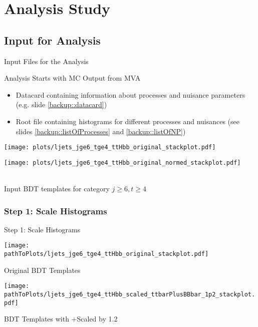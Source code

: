 \section{\ttbarH Analysis Study}
\subsection{Input for Analysis}
\begin{frame}{Input Files for the Analysis}
\begin{block}{Analysis Starts with MC Output from MVA}
\begin{itemize}
\item Datacard containing information about processes and nuisance parameters (e.g. slide \ref{backup::datacard})
\item Root file containing histograms for different processes and nuisances (see slides \ref{backup::listOfProcesses} and \ref{backup::listOfNP})
\end{itemize}
\end{block}

\begin{minipage}{0.45\textwidth}
\texttt{[image: plots/ljets\_jge6\_tge4\_ttHbb\_original\_stackplot.pdf]}
\end{minipage}
\hfill
\begin{minipage}{0.45\textwidth}
\texttt{[image: plots/ljets\_jge6\_tge4\_ttHbb\_original\_normed\_stackplot.pdf]}
\end{minipage}\\
\centering Input BDT templates for category $j\geq 6, t\geq 4$
\end{frame}


\subsubsection{Step 1: Scale Histograms}
\begin{frame}{Step 1: Scale Histograms}

\begin{minipage}{0.48\textwidth}
\centering
\texttt{[image: \\pathToPlots/ljets\_jge6\_tge4\_ttHbb\_original\_stackplot.pdf]}

\centering Original BDT Templates
\label{fig::compare_stackPlot64}
\end{minipage}
\hfill
\begin{minipage}{0.48\textwidth}
\centering
\texttt{[image: \\pathToPlots/ljets\_jge6\_tge4\_ttHbb\_scaled\_ttbarPlusBBbar\_1p2\_stackplot.pdf]}

\centering BDT Templates with \ttbar+\bbbar Scaled by \num[round-precision=1]{1.2}
\label{fig::compare_scaled_stackPlot64}
\end{minipage}



\end{frame}

